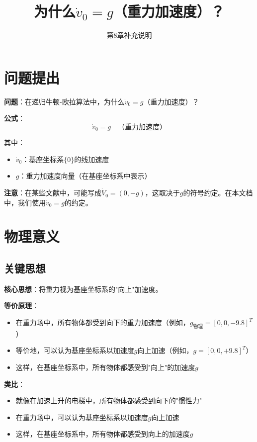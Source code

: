 \documentclass[12pt,a4paper]{article}
\title{为什么$\dot{v}_0 = g$（重力加速度）？}
\author{第8章补充说明}
\date{}
\begin{document}
\maketitle

\section{问题提出}

\textbf{问题}：在递归牛顿-欧拉算法中，为什么$\dot{v}_0 = g$（重力加速度）？

\textbf{公式}：
\begin{equation}
\dot{v}_0 = g \quad \text{（重力加速度）} \tag{14}
\end{equation}

其中：
\begin{itemize}
\item $\dot{v}_0$：基座坐标系$\{0\}$的线加速度
\item $g$：重力加速度向量（在基座坐标系中表示）
\end{itemize}

\textbf{注意}：在某些文献中，可能写成$\dot{V}_0 = (0, -g)$，这取决于$g$的符号约定。在本文档中，我们使用$\dot{v}_0 = g$的约定。

\section{物理意义}

\subsection{关键思想}

\textbf{核心思想}：将重力视为基座坐标系的"向上"加速度。

\textbf{等价原理}：
\begin{itemize}
\item 在重力场中，所有物体都受到向下的重力加速度（例如，$g_{\text{物理}} = [0, 0, -9.8]^T$）
\item 等价地，可以认为基座坐标系以加速度$g$向上加速（例如，$g = [0, 0, +9.8]^T$）
\item 这样，在基座坐标系中，所有物体都感受到"向上"的加速度$g$
\end{itemize}

\textbf{类比}：
\begin{itemize}
\item 就像在加速上升的电梯中，所有物体都感受到向下的"惯性力"
\item 在重力场中，可以认为基座坐标系以加速度$g$向上加速
\item 这样，在基座坐标系中，所有物体都感受到向上的加速度$g$
\end{itemize}
\end{document}
